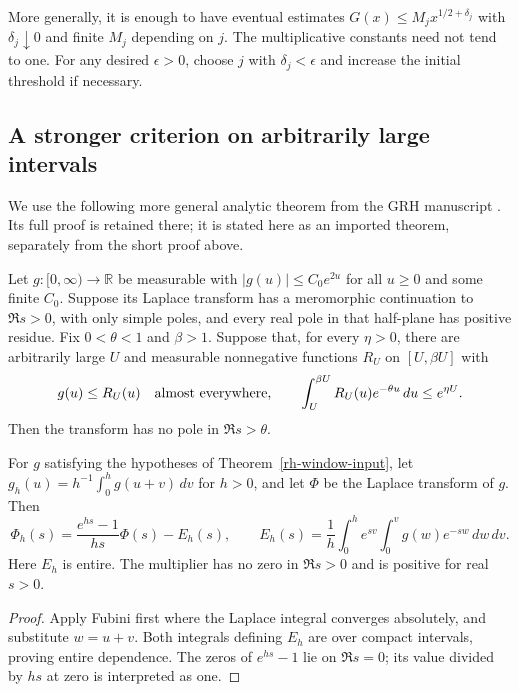 More generally, it is enough to have eventual estimates
$G(x)\le M_jx^{1/2+\delta_j}$ with $\delta_j\downarrow0$ and finite
$M_j$ depending on $j$. The multiplicative constants need not tend
to one. For any desired $\epsilon>0$, choose $j$ with
$\delta_j<\epsilon$ and increase the initial threshold if necessary.

\subsection{A stronger criterion on arbitrarily large intervals}

We use the following more general analytic theorem from the GRH
manuscript \cite[section ``One-sided criteria for zeros'', proposition
on positive majorants on long intervals]{rh-companion}. Its full
proof is retained there; it is stated here as an imported theorem,
separately from the short proof above.

\begin{theorem}
\label{rh-window-input}
Let $g:[0,\infty)\to\mathbb R$ be measurable with
$|g(u)|\le C_0e^{2u}$ for all $u\ge0$ and some finite $C_0$.
Suppose its Laplace transform has a meromorphic
continuation to $\Re s>0$, with only simple poles, and every real pole
in that half-plane has positive residue. Fix $0<\theta<1$ and $\beta>1$.
Suppose that, for every $\eta>0$, there are arbitrarily large $U$
and measurable nonnegative functions $R_U$ on $[U,\beta U]$ with
\[
 g(u)\le R_U(u)\quad\hbox{almost everywhere},\qquad
 \int_U^{\beta U}R_U(u)e^{-\theta u}\,du\le e^{\eta U}.
\]
Then the transform has no pole in $\Re s>\theta$.
\end{theorem}

\begin{lemma}
\label{rh-averaging}
For $g$ satisfying the hypotheses of Theorem~\ref{rh-window-input},
let $g_h(u)=h^{-1}\int_0^hg(u+v)\,dv$ for $h>0$, and let $\Phi$
be the Laplace transform of $g$. Then
\[
 \Phi_h(s)=\frac{e^{hs}-1}{hs}\Phi(s)-E_h(s),\qquad
 E_h(s)=\frac1h\int_0^he^{sv}\int_0^vg(w)e^{-sw}\,dw\,dv.
\]
Here $E_h$ is entire. The multiplier has no zero in $\Re s>0$ and
is positive for real $s>0$.
\end{lemma}

\begin{proof}
Apply Fubini first where the Laplace integral converges absolutely,
and substitute $w=u+v$. Both integrals defining $E_h$ are over compact
intervals, proving entire dependence. The zeros of $e^{hs}-1$ lie
on $\Re s=0$; its value divided by $hs$ at zero is interpreted as one.
\end{proof}

